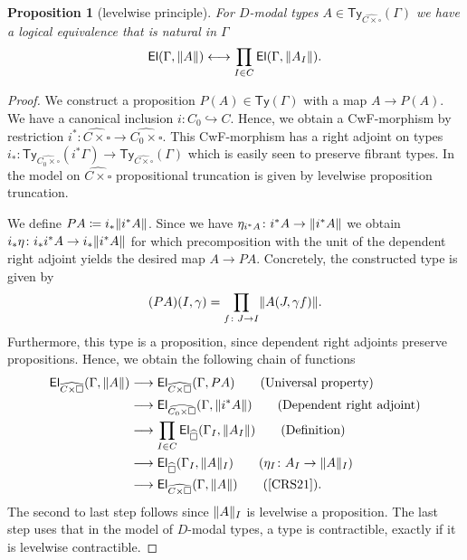 \documentclass[10pt,a4paper]{article}
\newtheorem{proposition}{Proposition}[section]
\newcommand\Ty{\mathsf{Ty}}
\newcommand\El{\mathsf{El}}
\DeclarePairedDelimiter\trunc{\lVert}{\rVert}
\begin{document}
\begin{proposition}[levelwise principle]
  For $D$-modal types $A \in \Ty_{\widehat{C \times \square}}(\Gamma)$ we have a logical equivalence that is natural in $\Gamma$
  \[
    \El(\Gamma, \trunc{ A }) \longleftrightarrow \prod_{I \in C} \El(\Gamma, \trunc{A_I}).
  \]
\end{proposition}
\begin{proof}
  We construct a proposition $P(A) \in \Ty(\Gamma)$ with a map $A \to P(A)$.
  We have a canonical inclusion $i \colon C_0 \hookrightarrow C$.
  Hence, we obtain a CwF-morphism by restriction $i^* \colon \widehat{C \times \square} \to \widehat{C_0 \times \square}$.
  This CwF-morphism has a right adjoint on types $i_* \colon \Ty_{\widehat{C_0 \times \square}}(i^*\Gamma) \to \Ty_{\widehat{C \times \square}}(\Gamma)$ which is easily seen to preserve fibrant types.
  In the model on $\widehat{C \times \square}$ propositional truncation is given by levelwise proposition truncation.
  
  We define $PA \coloneqq i_*\trunc{i^*A}$.
  Since we have $\eta_{i^*A} \colon i^* A \to \trunc{i^*A}$ we obtain $i_*\eta \colon i_*i^*A \to i_*\trunc{i^*A}$ for which precomposition with the unit of the dependent right adjoint yields the desired map $A \to PA$.
  Concretely, the constructed type is given by
  \[
    (PA)(I, \gamma) = \prod_{f \colon J \to I} \trunc{A(J, \gamma f)}.
  \]
  Furthermore, this type is a proposition, since dependent right adjoints preserve propositions.
  Hence, we obtain the following chain of functions
  \begin{align*}
    \El_{\widehat{C \times \square}}(\Gamma, \trunc{A})
    &\longrightarrow \El_{\widehat{C \times \square}}(\Gamma, PA) \tag{Universal property} \\
    &\longrightarrow \El_{\widehat{C_0 \times \square}}(\Gamma, \trunc{i^*A}) \tag{Dependent right adjoint} \\
    &\longrightarrow \prod_{I \in C} \El_{\widehat\square}(\Gamma_I, \trunc{A_I}) \tag{Definition} \\
    &\longrightarrow \El_{\widehat{\square}}(\Gamma_I, \trunc{A}_I) \tag{$\eta_I \colon A_I \to \trunc{A}_I$}  \\
    &\longrightarrow \El_{\widehat{C \times \square}}(\Gamma, \trunc{A}) \tag{\cite[Proposition~16]{CRS21}}.
  \end{align*}
  The second to last step follows since $\trunc{A}_I$ is levelwise a proposition.
  The last step uses that in the model of $D$-modal types, a type is contractible, exactly if it is levelwise contractible.
\end{proof}
\end{document}
